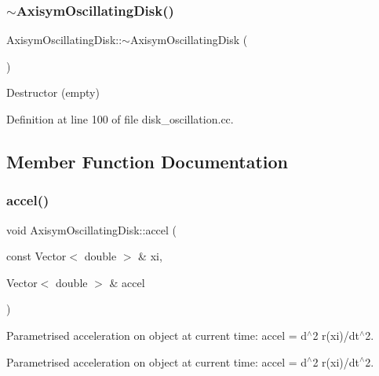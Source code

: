 \mbox{\label{classAxisymOscillatingDisk_ab79de13fa0dcfac5d04d6ff371241c5d}} 
\subsubsection{\texorpdfstring{$\sim$\+Axisym\+Oscillating\+Disk()}{~AxisymOscillatingDisk()}}
{\footnotesize\ttfamily Axisym\+Oscillating\+Disk\+::$\sim$\+Axisym\+Oscillating\+Disk (\begin{DoxyParamCaption}{ }\end{DoxyParamCaption})\hspace{0.3cm}{\ttfamily [inline]}}



Destructor (empty) 



Definition at line 100 of file disk\+\_\+oscillation.\+cc.



\subsection{Member Function Documentation}
\mbox{\label{classAxisymOscillatingDisk_a92993399b50f818c9045fe7cecf47fcb}} 
\subsubsection{\texorpdfstring{accel()}{accel()}}
{\footnotesize\ttfamily void Axisym\+Oscillating\+Disk\+::accel (\begin{DoxyParamCaption}\item[{const Vector$<$ double $>$ \&}]{xi,  }\item[{Vector$<$ double $>$ \&}]{accel }\end{DoxyParamCaption})}



Parametrised acceleration on object at current time\+: accel = d$^\wedge$2 r(xi)/dt$^\wedge$2. 

Parametrised acceleration on object at current time\+: accel = d$^\wedge$2 r(xi)/dt$^\wedge$2. 

